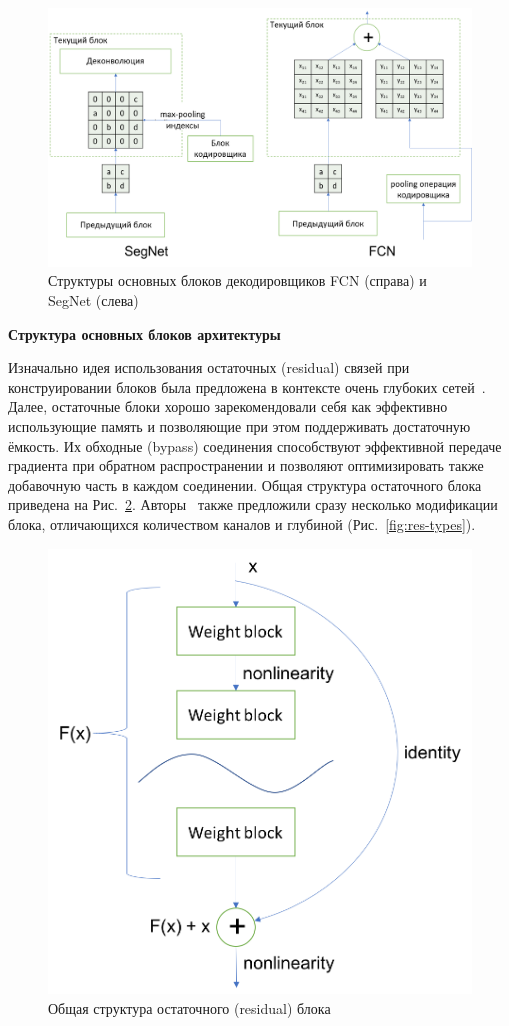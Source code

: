 \begin{figure}[t!]
	\centering
	\includegraphics[width=0.95\columnwidth]{pictures/fcn_segnet.png}
	\caption{Структуры основных блоков декодировщиков FCN (справа) и SegNet (слева)}
	\label{fig:fcn-segnet}
\end{figure}

{\bf Структура основных блоков архитектуры}
\label{sec:segm_proposed_blocks}

Изначально идея использования остаточных (residual) связей при конструировании блоков была предложена в контексте очень глубоких сетей~\cite{he_2016}. Далее, остаточные блоки хорошо зарекомендовали себя как эффективно использующие память и позволяющие при этом поддерживать достаточную ёмкость. Их обходные (bypass) соединения способствуют эффективной передаче градиента при обратном распространении и позволяют оптимизировать также добавочную часть в каждом соединении. Общая структура остаточного блока приведена на Рис.~\ref{fig:gen-resnet}. Авторы~\cite{he_2016} также предложили сразу несколько модификации блока, отличающихся количеством каналов и глубиной (Рис.~\ref{fig:res-types}).

\begin{figure}[h!]
	\centering
	\includegraphics[width=0.45\columnwidth]{pictures/general_resnet.png}
	\caption{Общая структура остаточного (residual) блока}
	\label{fig:gen-resnet}
\end{figure}


